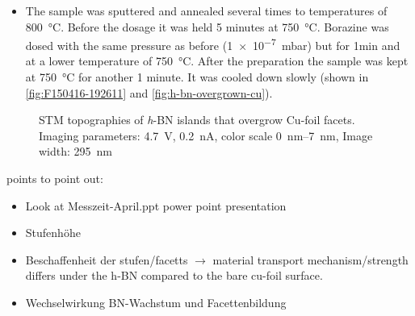 	\begin{itemize}
		\item The sample was sputtered and annealed several times to temperatures of \SI{800}{\celsius}. Before the dosage it was held 5 minutes at \SI{750}{\celsius}. Borazine was dosed with the same pressure as before (\SI{1e-7}{\milli \bar}) but for 1min and at a lower temperature of \SI{750}{\celsius}. After the preparation the sample was kept at \SI{750}{\celsius} for another 1 minute. It was cooled down slowly (shown in \autoref{fig:F150416-192611} and \autoref{fig:h-bn-overgrown-cu}).
	\end{itemize} 
	\begin{figure}[h!]
		\centering
		 \quad %
		\caption{STM topographies of \textit{h}-BN islands that overgrow Cu-foil facets. Imaging parameters: 		
			\SI{4.7}{\volt}, \SI{0.2}{\nano\ampere}, color scale \SIrange{0}{7}{\nano\meter}, Image width: \SI{295}{\nano \meter}
		}%
		\label{fig:h-bn-overgrown-cu}
	\end{figure}
	points to point out:
	\begin{itemize}
		\item Look at Messzeit-April.ppt power point presentation
		\item Stufenh\"ohe
		\item Beschaffenheit der stufen/facetts $\rightarrow$ material transport mechanism/strength differs under the h-BN compared to the bare cu-foil surface.
		\item Wechselwirkung BN-Wachstum und Facettenbildung
	\end{itemize}

\FloatBarrier

